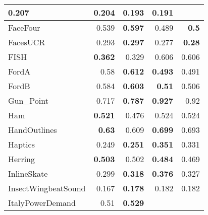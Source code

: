 \begin{longtable}{|l||r|r||r|r|}
\cellcolor[rgb]{ .973,  .796,  .678} \textbf{0.207} &
0.204 &
\cellcolor[rgb]{ .973,  .796,  .678} \textbf{0.193} &
0.191
\bigstrut\\
\hline
FaceFour &
0.539 &
\cellcolor[rgb]{ .973,  .796,  .678} \textbf{0.597} &
0.489 &
\cellcolor[rgb]{ .973,  .796,  .678} \textbf{0.5}
\bigstrut\\
\hline
\rowcolor[rgb]{ .851,  .851,  .851} FacesUCR &
0.293 &
\cellcolor[rgb]{ .973,  .796,  .678} \textbf{0.297} &
0.277 &
\cellcolor[rgb]{ .973,  .796,  .678} \textbf{0.28}
\bigstrut\\
\hline
FISH &
\cellcolor[rgb]{ .973,  .796,  .678} \textbf{0.362} &
0.329 &
0.606 &
0.606
\bigstrut\\
\hline
\rowcolor[rgb]{ .851,  .851,  .851} FordA &
0.58 &
\cellcolor[rgb]{ .973,  .796,  .678} \textbf{0.612} &
\cellcolor[rgb]{ .973,  .796,  .678} \textbf{0.493} &
0.491
\bigstrut\\
\hline
FordB &
0.584 &
\cellcolor[rgb]{ .973,  .796,  .678} \textbf{0.603} &
\cellcolor[rgb]{ .973,  .796,  .678} \textbf{0.51} &
0.506
\bigstrut\\
\hline
\rowcolor[rgb]{ .851,  .851,  .851} Gun\_Point &
0.717 &
\cellcolor[rgb]{ .973,  .796,  .678} \textbf{0.787} &
\cellcolor[rgb]{ .973,  .796,  .678} \textbf{0.927} &
0.92
\bigstrut\\
\hline
Ham &
\cellcolor[rgb]{ .973,  .796,  .678} \textbf{0.521} &
0.476 &
0.524 &
0.524
\bigstrut\\
\hline
\rowcolor[rgb]{ .851,  .851,  .851} HandOutlines &
\cellcolor[rgb]{ .973,  .796,  .678} \textbf{0.63} &
0.609 &
\cellcolor[rgb]{ .973,  .796,  .678} \textbf{0.699} &
0.693
\bigstrut\\
\hline
Haptics &
0.249 &
\cellcolor[rgb]{ .973,  .796,  .678} \textbf{0.251} &
\cellcolor[rgb]{ .973,  .796,  .678} \textbf{0.351} &
0.331
\bigstrut\\
\hline
\rowcolor[rgb]{ .851,  .851,  .851} Herring &
\cellcolor[rgb]{ .973,  .796,  .678} \textbf{0.503} &
0.502 &
\cellcolor[rgb]{ .973,  .796,  .678} \textbf{0.484} &
0.469
\bigstrut\\
\hline
InlineSkate &
0.299 &
\cellcolor[rgb]{ .973,  .796,  .678} \textbf{0.318} &
\cellcolor[rgb]{ .973,  .796,  .678} \textbf{0.376} &
0.327
\bigstrut\\
\hline
\rowcolor[rgb]{ .851,  .851,  .851} InsectWingbeatSound &
0.167 &
\cellcolor[rgb]{ .973,  .796,  .678} \textbf{0.178} &
0.182 &
0.182
\bigstrut\\
\hline
ItalyPowerDemand &
0.51 &
\cellcolor[rgb]{ .973,  .796,  .678} \textbf{0.529} &

\end{longtable}
